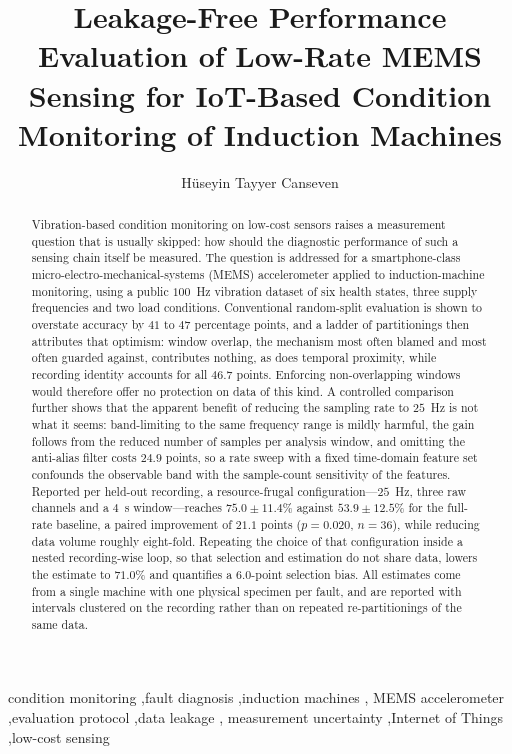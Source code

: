 \documentclass[preprint,review,3p,number]{elsarticle}
\begin{document}
\begin{frontmatter}

\title{Leakage-Free Performance Evaluation of Low-Rate MEMS Sensing for
IoT-Based Condition Monitoring of Induction Machines}

\author[lut]{H\"useyin Tayyer Canseven}

\begin{abstract}
Vibration-based condition monitoring on low-cost sensors raises a measurement
question that is usually skipped: how should the diagnostic performance of such a
sensing chain itself be measured. The question is addressed for a
smartphone-class micro-electro-mechanical-systems (MEMS) accelerometer applied to
induction-machine monitoring, using a public $100$~Hz vibration dataset of six
health states, three supply frequencies and two load conditions. Conventional
random-split evaluation is shown to overstate accuracy by $41$ to $47$ percentage
points, and a ladder of partitionings then attributes that optimism: window
overlap, the mechanism most often blamed and most often guarded against,
contributes nothing, as does temporal proximity, while recording identity accounts
for all $46.7$ points. Enforcing non-overlapping windows would therefore offer no
protection on data of this kind. A controlled comparison further shows that the
apparent benefit of reducing the sampling rate to $25$~Hz is not what it seems:
band-limiting to the same frequency range is mildly harmful, the gain follows from
the reduced number of samples per analysis window, and omitting the anti-alias
filter costs $24.9$ points, so a rate sweep with a fixed time-domain feature set
confounds the observable band with the sample-count sensitivity of the features.
Reported per held-out recording, a resource-frugal configuration---$25$~Hz, three
raw channels and a $4$~s window---reaches $75.0\pm11.4\%$ against $53.9\pm12.5\%$
for the full-rate baseline, a paired improvement of $21.1$ points
($p=0.020$, $n=36$), while reducing data volume roughly eight-fold. Repeating the
choice of that configuration inside a nested recording-wise loop, so that
selection and estimation do not share data, lowers the estimate to $71.0\%$ and
quantifies a $6.0$-point selection bias. All estimates come from a single machine with one physical specimen per fault, and are reported
with intervals clustered on the recording rather than on repeated re-partitionings
of the same data.
\end{abstract}

\begin{keyword}
condition monitoring \sep fault diagnosis \sep induction machines \sep
MEMS accelerometer \sep evaluation protocol \sep data leakage \sep
measurement uncertainty \sep Internet of Things \sep low-cost sensing
\end{keyword}

\end{frontmatter}
\end{document}
